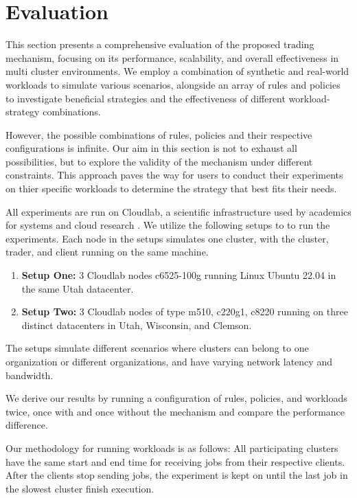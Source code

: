 \chapter{Evaluation}

This section presents a comprehensive evaluation of the proposed trading
mechanism, focusing on its performance, scalability, and overall effectiveness
in multi cluster environments. We employ a combination of synthetic and
real-world workloads to simulate various scenarios, alongside an array of rules
and policies to investigate beneficial strategies and the effectiveness of
different workload-strategy combinations.

However, the possible combinations of rules, policies and their respective
configurations is infinite. Our aim in this section is not to exhaust all
possibilities, but to explore the validity of the mechanism under different
constraints. This approach paves the way for users to conduct their experiments
on thier specific workloads to determine the strategy that best fits their
needs.  

All experiments are run on Cloudlab, a scientific infrastructure used by
academics for systems and cloud research \cite{duplyakin_design_2019}. We
utilize the following setups to to run the experiments. Each node in the setups
simulates one cluster, with the cluster, trader, and client running on the same
machine. 
\begin{enumerate}

  \item \textbf{Setup One:} 3 Cloudlab nodes c6525-100g running Linux
    Ubuntu 22.04 in the same Utah datacenter.

  \item \textbf{Setup Two:} 3 Cloudlab nodes of type m510, c220g1, c8220
    running on three distinct datacenters in Utah, Wisconsin, and Clemson.
\end{enumerate}

The setups simulate different scenarios where clusters can belong to one
organization or different organizations, and have varying network latency and
bandwidth.  

We derive our results by running a configuration of rules, policies, and
workloads twice, once with and once without the mechanism and compare the
performance difference.

Our methodology for running workloads is as follows: All participating clusters
have the same start and end time for receiving jobs from their respective
clients. After the clients stop sending jobs, the experiment is kept on until
the last job in the slowest cluster finish execution. 


